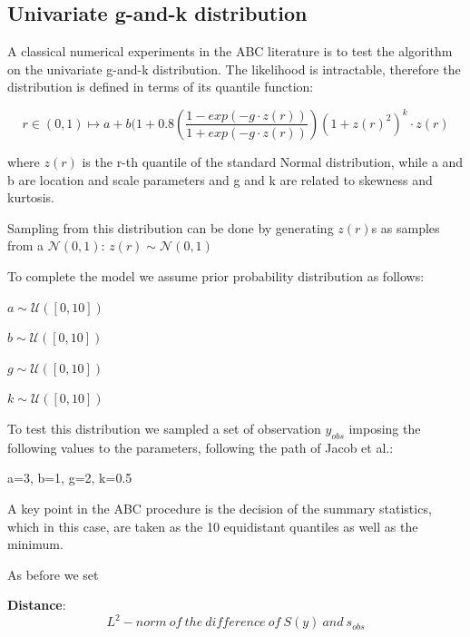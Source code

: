 \documentclass {article}
\begin{document}
\subsection{Univariate g-and-k distribution}

A classical numerical experiments in the ABC literature is to test the algorithm on the univariate g-and-k distribution.
The likelihood is intractable, therefore the distribution is defined in terms of its quantile function:

\begin{center}
	
	$$ r \in (0,1) \longmapsto   a + b (1+0.8\left(\frac{1-exp(-g \cdot z(r))}{1+exp(-g\cdot z(r))}\right)(1+ z(r)^{2})^k\cdot z(r)  $$
\end{center}



where $z(r)$ is the r-th quantile of the standard Normal distribution,
while a and b are location and scale parameters and g and k are related to skewness and kurtosis.


Sampling from this distribution can be done by generating $z(r)$s as samples from a $\mathcal{N}(0,1)$: 
$z(r) \sim \mathcal{N}(0,1)$

To complete the model we assume prior probability distribution as follows:
\begin{center}
	$ a \sim \mathcal{U}([0,10])$
	
	$ b \sim \mathcal{U}([0,10])$
	
	$ g \sim \mathcal{U}([0,10])$
	
	$ k \sim \mathcal{U}([0,10])$
\end{center}


To test this distribution we sampled a set of observation $y_{obs}$ imposing the following values to the parameters, following the path of Jacob et al.:

a=3, b=1, g=2, k=0.5

A key point in the ABC procedure is the decision of the summary statistics, which in this case, are taken as the 10 equidistant quantiles as well as the minimum.

As before we set 

\textbf{Distance}: 
$$L^2-norm\ of\ the\ difference\ of\ S(y)\ and\ s_{obs}$$
\end{document}
